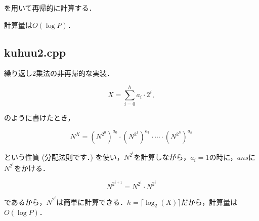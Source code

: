 \documentclass[slide,20pt]{ltjsarticle}
\begin{document}
を用いて再帰的に計算する．

計算量は$O(\log P)$．

\subsection*{kuhuu2.cpp}
繰り返し$2$乗法の非再帰的な実装．

\[ X = \sum_{i = 0} ^ {h} a_i \cdot 2 ^ i, \]

のように書けたとき，

\[ N ^ X = \left(N ^ {2 ^ 0}\right) ^ {a_0} \cdot \left(N ^ {2 ^ 1}\right) ^ {a_1} \cdot \cdots \cdot \left(N ^ {2 ^ h}\right) ^ {a_h} \]

という性質 (分配法則です．) を使い，$N ^ {2 ^ i}$を計算しながら，$a_i = 1$の時に，$ans$に$N ^ {2 ^ i}$をかける．

\[ N ^ {2 ^ {i + 1}} = N ^ {2 ^ {i}} \cdot N ^ {2 ^ {i}} \]

であるから，$N ^ {2 ^ i}$は簡単に計算できる．$h = \lceil \log_2(X) \rceil$だから，計算量は$O(\log P)$．
\end{document}
